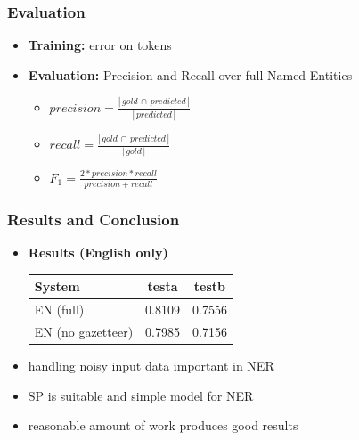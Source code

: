 \documentclass[10pt]{beamer}
\begin{document}
\begin{frame}
\frametitle{Evaluation}
\begin{itemize}
	\item \textbf{Training:} error on tokens
	\item \textbf{Evaluation:} Precision and Recall over full Named Entities
	\begin{itemize}



		\item \vspace{0.3cm} $\displaystyle precision =  \frac{  |\,gold\,\cap\,predicted\,| }{ |\,predicted\,| }$ 
		\item \vspace{0.3cm} $\displaystyle recall = \frac{ |\,gold\,\cap\,predicted\,| }{ |\,gold\,| }$ 
		\item \vspace{0.3cm} $\displaystyle F_{1} = \frac{ 2 * precision*recall }{precision + recall} $ 
 

	\end{itemize}

\end{itemize}
\end{frame}




\begin{frame}
\frametitle{Results and Conclusion}
\begin{itemize}
\item \textbf{Results (English only)}\\
\begin{tabular}{l c c}
System                & testa & testb\\
\hline
EN (full)             & 0.8109 & 0.7556 \\
EN (no gazetteer)     & 0.7985 & 0.7156\\
\end{tabular} 
\vspace{0.3cm}
\item handling noisy input data important in NER
\item SP is suitable and simple model for NER 
\item reasonable amount of work produces good results 


\end{itemize}
\end{frame}
\end{document}
